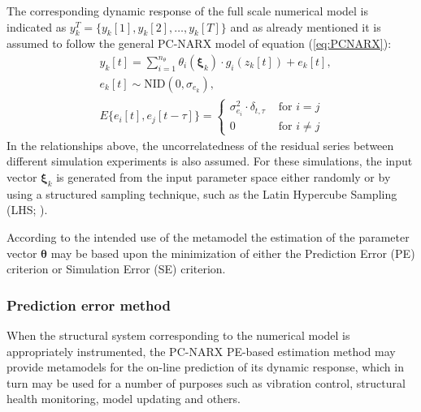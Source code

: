 \documentclass[12pt,a4paper,twocolumn,fleqn]{narms}
\newcommand{\bld}[1]{\boldsymbol{#1}}
\newcommand{\bth}{\bld{\theta}}
\newcommand{\bxi}{\bld{\xi}}
\begin{document}
The corresponding dynamic response of the full scale numerical model is indicated as $y_k^T = \{ y_k[1], y_k[2], \ldots, y_k[T] \}$ and as already mentioned it is assumed to follow the general PC-NARX model of equation (\ref{eq:PCNARX}):
\begin{subequations} \label{eq:assumptions}
\begin{align} & y_k[t] = \sum_{i=1}^{n_\theta} \theta_i(\bxi_k) \cdot g_i(z_k[t]) + e_k[t], \label{eq:exp_n} \\  
& e_k[t] \sim  \mbox{NID}(0,\sigma_{e_k}), \\ 
& E\{ e_i [t], e_j[ t - \tau ] \} =  
\begin{cases} 
\sigma^2_{e_i} \cdot \delta_{t,\tau} & \mbox{ for } i = j \\
 0 &  \mbox{ for } i \neq j \end{cases}
\end{align}
\end{subequations}
In the relationships above, the uncorrelatedness of the residual series between different simulation experiments is also assumed. For these simulations, the input vector $\bxi_k$ is generated from the input parameter space either randomly or by using a structured sampling technique, such as the Latin Hypercube Sampling (LHS; ).

According to the intended use of the metamodel the estimation of the parameter vector $\bth$ may be based upon the minimization of either the Prediction Error (PE) criterion or Simulation Error (SE) criterion. 

\subsubsection{Prediction error method} \label{sec:estimation}

When the structural system corresponding to the numerical model is appropriately instrumented, the PC-NARX PE-based estimation method may provide metamodels for the on-line prediction of its dynamic response, which in turn may be used for a number of purposes such as vibration control, structural health monitoring, model updating and others. 
\end{document}
